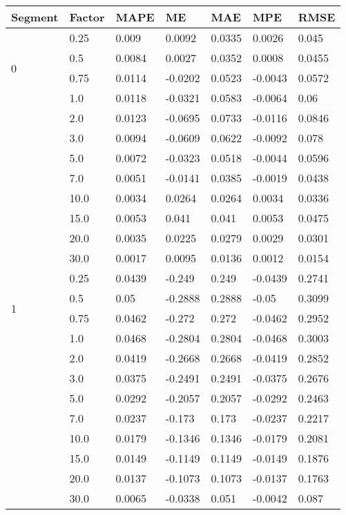 
        \begin{table}[htbp]
            \centering
            \begin{tabular}{|l|l|l|l|l|l|l|}
            \hline
            Segment            & Factor    & MAPE       & ME       & MAE     & MPE         & RMSE    \\ \hline
            \multirow{4}{*}{0}&0.25&0.009&0.0092&0.0335&0.0026&0.045\\ \cline{2-7}
&0.5&0.0084&0.0027&0.0352&0.0008&0.0455\\ \cline{2-7}
&0.75&0.0114&-0.0202&0.0523&-0.0043&0.0572\\ \cline{2-7}
&1.0&0.0118&-0.0321&0.0583&-0.0064&0.06\\ \cline{2-7}
&2.0&0.0123&-0.0695&0.0733&-0.0116&0.0846\\ \cline{2-7}
&3.0&0.0094&-0.0609&0.0622&-0.0092&0.078\\ \cline{2-7}
&5.0&0.0072&-0.0323&0.0518&-0.0044&0.0596\\ \cline{2-7}
&7.0&0.0051&-0.0141&0.0385&-0.0019&0.0438\\ \cline{2-7}
&10.0&0.0034&0.0264&0.0264&0.0034&0.0336\\ \cline{2-7}
&15.0&0.0053&0.041&0.041&0.0053&0.0475\\ \cline{2-7}
&20.0&0.0035&0.0225&0.0279&0.0029&0.0301\\ \cline{2-7}
&30.0&0.0017&0.0095&0.0136&0.0012&0.0154\\ \cline{2-7}
\multirow{4}{*}{1}&0.25&0.0439&-0.249&0.249&-0.0439&0.2741\\ \cline{2-7}
&0.5&0.05&-0.2888&0.2888&-0.05&0.3099\\ \cline{2-7}
&0.75&0.0462&-0.272&0.272&-0.0462&0.2952\\ \cline{2-7}
&1.0&0.0468&-0.2804&0.2804&-0.0468&0.3003\\ \cline{2-7}
&2.0&0.0419&-0.2668&0.2668&-0.0419&0.2852\\ \cline{2-7}
&3.0&0.0375&-0.2491&0.2491&-0.0375&0.2676\\ \cline{2-7}
&5.0&0.0292&-0.2057&0.2057&-0.0292&0.2463\\ \cline{2-7}
&7.0&0.0237&-0.173&0.173&-0.0237&0.2217\\ \cline{2-7}
&10.0&0.0179&-0.1346&0.1346&-0.0179&0.2081\\ \cline{2-7}
&15.0&0.0149&-0.1149&0.1149&-0.0149&0.1876\\ \cline{2-7}
&20.0&0.0137&-0.1073&0.1073&-0.0137&0.1763\\ \cline{2-7}
&30.0&0.0065&-0.0338&0.051&-0.0042&0.087\\ \cline{2-7}

\end{tabular}
\end{table}
